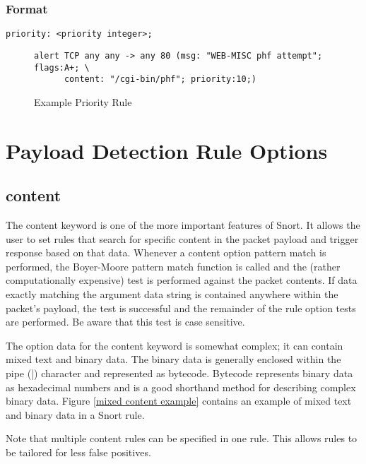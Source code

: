 \documentclass[english]{report}
\begin{document}
\subsubsection{Format}

\begin{verbatim}
priority: <priority integer>;
\end{verbatim}

\begin{figure}[!hbpt]
\begin{verbatim}
alert TCP any any -> any 80 (msg: "WEB-MISC phf attempt"; flags:A+; \
      content: "/cgi-bin/phf"; priority:10;)
\end{verbatim}

\caption{Example Priority Rule\label{example priority rule}}
\end{figure}



\section{Payload Detection Rule Options}
\subsection{content\label{sub:content}}

The content keyword is one of the more important features of Snort.
It allows the user to set rules that search for specific content in
the packet payload and trigger response based on that data. Whenever
a content option pattern match is performed, the Boyer-Moore pattern
match function is called and the (rather computationally expensive)
test is performed against the packet contents. If data exactly matching
the argument data string is contained anywhere within the packet's
payload, the test is successful and the remainder of the rule option
tests are performed. Be aware that this test is case sensitive.

The option data for the content keyword is somewhat complex; it can
contain mixed text and binary data. The binary data is generally enclosed
within the pipe (|) character and represented
as bytecode. Bytecode represents binary data as hexadecimal numbers
and is a good shorthand method for describing complex binary data.
Figure \ref{mixed content example} contains an example of mixed text
and binary data in a Snort rule. 

Note that multiple content rules can be specified in one rule. This
allows rules to be tailored for less false positives. 
\end{document}
